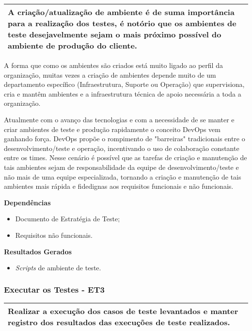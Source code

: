 \begin{table}[!ht]
\centering
\begin{tabular}{|p{130mm}|}
\hline
A criação/atualização de ambiente é de suma importância para a realização dos testes, é notório que os ambientes de teste desejavelmente sejam o mais próximo possível do ambiente de produção do cliente. \\ 
\hline
\end{tabular}
\end{table}

A forma que como os ambientes são criados está muito ligado ao perfil da organização, muitas vezes a criação de ambientes depende muito de um departamento específico (Infraestrutura, Suporte ou Operação) que supervisiona, cria e mantêm ambientes e a infraestrutura técnica de apoio necessária a toda a organização.

Atualmente com o avanço das tecnologias e com a necessidade de se manter e criar ambientes de teste e produção rapidamente o conceito DevOps vem ganhando força. DevOps propõe o rompimento de "barreiras" tradicionais entre o desenvolvimento/teste e operação, incentivando o uso de colaboração constante entre os times. Nesse cenário é possível que as tarefas de criação e manutenção de tais ambientes sejam de responsabilidade da equipe de desenvolvimento/teste e não mais de uma equipe especializada, tornando a criação e manutenção de tais ambientes mais rápida e fidedignas aos requisitos funcionais e não funcionais.

\textbf{Dependências}
\begin{itemize}
    \item Documento de Estratégia de Teste;
    \item Requisitos não funcionais.
\end{itemize}

\textbf{Resultados Gerados}
\begin{itemize}
    \item \textit{Scripts} de ambiente de teste.
\end{itemize}


\subsubsection{Executar os Testes - ET3}
\label{sec:et3}

\begin{table}[!ht]
\centering
\begin{tabular}{|p{130mm}|}
\hline
Realizar a execução dos casos de teste levantados e manter registro dos resultados das execuções de teste realizados. \\ 
\hline
\end{tabular}
\end{table}

